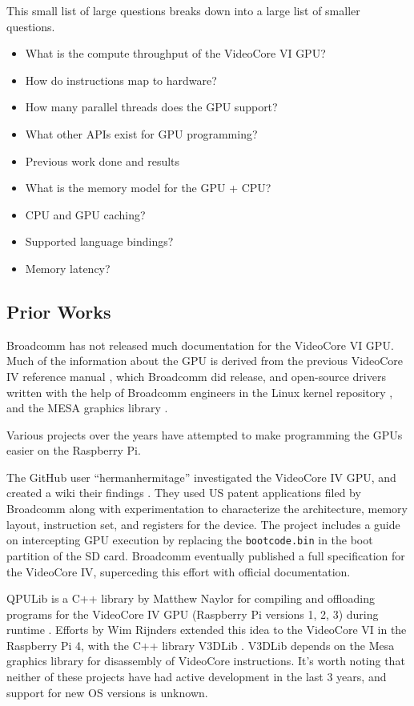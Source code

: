 \documentclass[12pt]{article}
\begin{document}
This small list of large questions breaks down into a large list of smaller questions.

\begin{itemize}
  \item What is the compute throughput of the VideoCore VI GPU?
  \item How do instructions map to hardware?
  \item How many parallel threads does the GPU support?
  \item What other APIs exist for GPU programming?
  \item Previous work done and results
  \item What is the memory model for the GPU + CPU?
  \item CPU and GPU caching?
  \item Supported language bindings?
  \item Memory latency?
\end{itemize}

\subsection{Prior Works}

Broadcomm has not released much documentation for the VideoCore VI GPU. Much of the information about the GPU is derived from the previous VideoCore IV reference manual \cite{videocoreiv}, which Broadcomm did release, and open-source drivers written with the help of Broadcomm engineers in the Linux kernel repository \cite{torvalds_linux_2024}, and the MESA graphics library \cite{external-mesa}. 

Various projects over the years have attempted to make programming the GPUs easier on the Raspberry Pi. 

The GitHub user ``hermanhermitage'' investigated the VideoCore IV GPU, and created a wiki their findings \cite{videocoreiv_herman}. They used US patent applications filed by Broadcomm along with experimentation to characterize the architecture, memory layout, instruction set, and registers for the device. The project includes a guide on intercepting GPU execution by replacing the \verb|bootcode.bin| in the boot partition of the SD card. Broadcomm eventually published a full specification for the VideoCore IV, superceding this effort with official documentation.

QPULib is a C++ library by Matthew Naylor for compiling and offloading programs for the VideoCore IV GPU (Raspberry Pi versions 1, 2, 3) during runtime \cite{QPULib}. Efforts by Wim Rijnders extended this idea to the VideoCore VI in the Raspberry Pi 4, with the C++ library V3DLib \cite{rijnders2021v3dlib}. V3DLib depends on the Mesa graphics library for disassembly of VideoCore instructions. It's worth noting that neither of these projects have had active development in the last 3 years, and support for new OS versions is unknown. 
\end{document}
